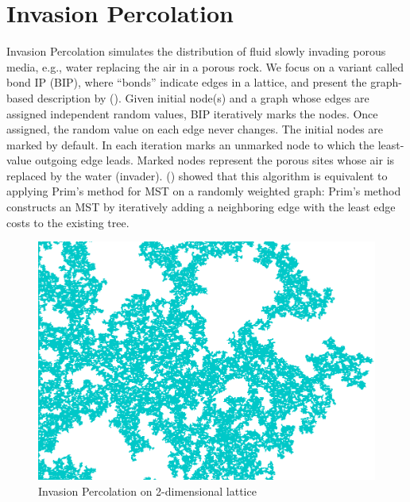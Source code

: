 \section{Invasion Percolation}

Invasion Percolation \cite{wilkinson1983invasion} simulates the distribution of fluid slowly %
invading porous media, e.g., water replacing the air in a porous rock.
We focus on a variant called bond IP (BIP), where ``bonds'' indicate edges in a lattice, and present the graph-based description by \citeauthor{barabasi1996invasion} (\citeyear{barabasi1996invasion}).
Given initial node(s) and a graph whose edges are assigned independent random values,
BIP iteratively marks the nodes.
Once assigned, the random value on each edge never changes.  The initial nodes are marked by default.
In each iteration marks an unmarked node to which the least-value outgoing edge leads.
Marked nodes represent the porous sites whose air is replaced by the water (invader).
\citeauthor{barabasi1996invasion} (\citeyear{barabasi1996invasion}) showed that
this algorithm is equivalent to applying Prim's method for MST \cite{prim1957shortest} on a randomly weighted graph:
Prim's method constructs an MST by iteratively adding a neighboring edge with the least edge costs
to the existing tree.


\begin{figure}[tb]
 \centering
 \includegraphics[width=0.4\linewidth]{img/static/ip.png}
 \caption{Invasion Percolation on 2-dimensional lattice}
 \label{fig:ip}
\end{figure}

